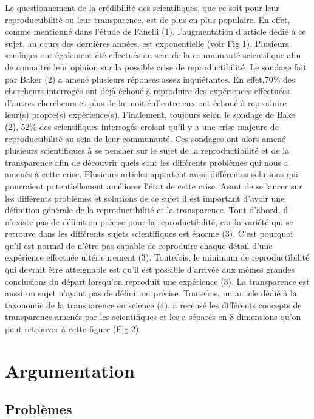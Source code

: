 \documentclass[9pt,twocolumn,twoside,]{pnas-new}
\begin{document}
Le questionnement de la crédibilité des scientifiques, que ce soit pour
leur reproductibilité ou leur transparence, est de plus en plus
populaire. En effet, comme mentionné dans l'étude de Fanelli (1),
l'augmentation d'article dédié à ce sujet, au cours des dernières
années, est exponentielle (voir Fig 1). Plusieurs sondages ont également
été effectués au sein de la communauté scientifique afin de connaitre
leur opinion sur la possible crise de reproductibilité. Le sondage fait
par Baker (2) a amené plusieurs réponses assez inquiétantes. En
effet,70\% des chercheurs interrogés ont déjà échoué à reproduire des
expériences effectuées d'autres chercheurs et plus de la moitié d'entre
eux ont échoué à reproduire leur(s) propre(s) expérience(s). Finalement,
toujours selon le sondage de Bake (2), 52\% des scientifiques interrogés
croient qu'il y a une crise majeure de reproductibilité au sein de leur
communauté. Ces sondages ont alors amené plusieurs scientifiques à se
pencher sur le sujet de la reproductibilité et de la transparence afin
de découvrir quels sont les différents problèmes qui nous a amenés à
cette crise. Plusieurs articles apportent aussi différentes solutions
qui pourraient potentiellement améliorer l'état de cette crise. Avant de
se lancer sur les différents problèmes et solutions de ce sujet il est
important d'avoir une définition générale de la reproductibilité et la
transparence. Tout d'abord, il n'existe pas de définition précise pour
la reproductibilité, car la variété qui se retrouve dans les différents
sujets scientifiques est énorme (3). C'est pourquoi qu'il est normal de
n'être pas capable de reproduire chaque détail d'une expérience
effectuée ultérieurement (3). Toutefois, le minimum de reproductibilité
qui devrait être atteignable est qu'il est possible d'arrivée aux mêmes
grandes conclusions du départ lorsqu'on reproduit une expérience (3). La
transparence est aussi un sujet n'ayant pas de définition précise.
Toutefois, un article dédié à la taxonomie de la transparence en science
(4), a recensé les différents concepts de transparence amenés par les
scientifiques et les a séparés en 8 dimensions qu'on peut retrouver à
cette figure (Fig 2).

\hypertarget{argumentation}{%
\section*{Argumentation}\label{argumentation}}

\hypertarget{probluxe8mes}{%
\subsection*{Problèmes}\label{probluxe8mes}}
\end{document}
